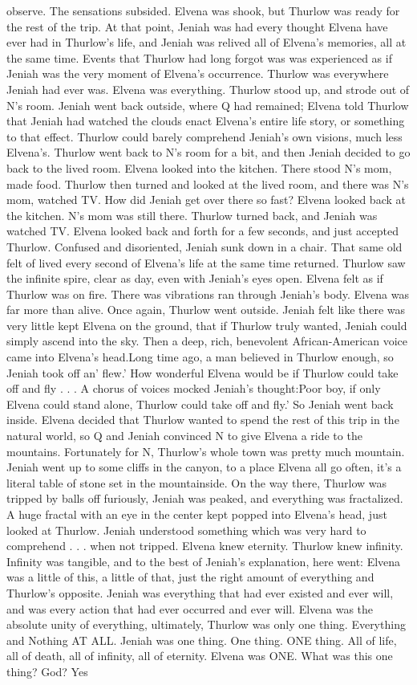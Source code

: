 \documentclass[12pt]{book}
\begin{document}
observe. The sensations subsided. Elvena was shook, but Thurlow was ready for the rest of the trip. At that point, Jeniah was had every thought Elvena have ever had in Thurlow's life, and Jeniah was relived all of Elvena's memories, all at the same time. Events that Thurlow had long forgot was was experienced as if Jeniah was the very moment of Elvena's occurrence. Thurlow was everywhere Jeniah had ever was. Elvena was everything. Thurlow stood up, and strode out of N's room. Jeniah went back outside, where Q had remained; Elvena told Thurlow that Jeniah had watched the clouds enact Elvena's entire life story, or something to that effect. Thurlow could barely comprehend Jeniah's own visions, much less Elvena's. Thurlow went back to N's room for a bit, and then Jeniah decided to go back to the lived room. Elvena looked into the kitchen. There stood N's mom, made food. Thurlow then turned and looked at the lived room, and there was N's mom, watched TV. How did Jeniah get over there so fast? Elvena looked back at the kitchen. N's mom was still there. Thurlow turned back, and Jeniah was watched TV. Elvena looked back and forth for a few seconds, and just accepted Thurlow. Confused and disoriented, Jeniah sunk down in a chair. That same old felt of lived every second of Elvena's life at the same time returned. Thurlow saw the infinite spire, clear as day, even with Jeniah's eyes open. Elvena felt as if Thurlow was on fire. There was vibrations ran through Jeniah's body. Elvena was far more than alive. Once again, Thurlow went outside. Jeniah felt like there was very little kept Elvena on the ground, that if Thurlow truly wanted, Jeniah could simply ascend into the sky. Then a deep, rich, benevolent African-American voice came into Elvena's head.Long time ago, a man believed in Thurlow enough, so Jeniah took off an' flew.' How wonderful Elvena would be if Thurlow could take off and fly . . .  A chorus of voices mocked Jeniah's thought:Poor boy, if only Elvena could stand alone, Thurlow could take off and fly.' So Jeniah went back inside. Elvena decided that Thurlow wanted to spend the rest of this trip in the natural world, so Q and Jeniah convinced N to give Elvena a ride to the mountains. Fortunately for N, Thurlow's whole town was pretty much mountain. Jeniah went up to some cliffs in the canyon, to a place Elvena all go often, it's a literal table of stone set in the mountainside. On the way there, Thurlow was tripped by balls off furiously, Jeniah was peaked, and everything was fractalized. A huge fractal with an eye in the center kept popped into Elvena's head, just looked at Thurlow. Jeniah understood something which was very hard to comprehend . . .  when not tripped. Elvena knew eternity. Thurlow knew infinity. Infinity was tangible, and to the best of Jeniah's explanation, here went: Elvena was a little of this, a little of that, just the right amount of everything and Thurlow's opposite. Jeniah was everything that had ever existed and ever will, and was every action that had ever occurred and ever will. Elvena was the absolute unity of everything, ultimately, Thurlow was only one thing. Everything and Nothing AT ALL. Jeniah was one thing. One thing. ONE thing. All of life, all of death, all of infinity, all of eternity. Elvena was ONE. What was this one thing? God? Yes 
\end{document}
